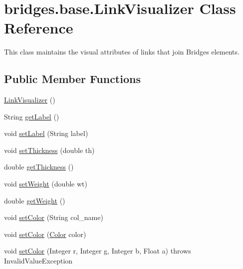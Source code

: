 \hypertarget{classbridges_1_1base_1_1_link_visualizer}{}\section{bridges.\+base.\+Link\+Visualizer Class Reference}
\label{classbridges_1_1base_1_1_link_visualizer}


This class maintains the visual attributes of links that join Bridges elements.  


\subsection*{Public Member Functions}
\begin{DoxyCompactItemize}
\item 
\mbox{\hyperlink{classbridges_1_1base_1_1_link_visualizer_a0b69f099fa264ae9097b0efe278c6a1b}{Link\+Visualizer}} ()
\item 
String \mbox{\hyperlink{classbridges_1_1base_1_1_link_visualizer_a9ed60a0f8a337cd2c98b2d6ab07b8601}{get\+Label}} ()
\item 
void \mbox{\hyperlink{classbridges_1_1base_1_1_link_visualizer_a073d84e04dd95c3848c9f4e0ad74eb77}{set\+Label}} (String label)
\item 
void \mbox{\hyperlink{classbridges_1_1base_1_1_link_visualizer_a702e9ca345d1a4a035baf2041f275849}{set\+Thickness}} (double th)
\item 
double \mbox{\hyperlink{classbridges_1_1base_1_1_link_visualizer_af1592d2a8664b00c1a51fdc0f8d1860a}{get\+Thickness}} ()
\item 
void \mbox{\hyperlink{classbridges_1_1base_1_1_link_visualizer_a21d5884d243cf5a08f9d544f5083a44c}{set\+Weight}} (double wt)
\item 
double \mbox{\hyperlink{classbridges_1_1base_1_1_link_visualizer_ac96d7fb118ae6c7e1bdd57c5e2c8639a}{get\+Weight}} ()
\item 
void \mbox{\hyperlink{classbridges_1_1base_1_1_link_visualizer_a92f306dbd73b961befa8ab4c0620a89e}{set\+Color}} (String col\+\_\+name)
\item 
void \mbox{\hyperlink{classbridges_1_1base_1_1_link_visualizer_ab05a7576f99818937276a4937eedeee1}{set\+Color}} (\mbox{\hyperlink{classbridges_1_1base_1_1_color}{Color}} color)
\item 
void \mbox{\hyperlink{classbridges_1_1base_1_1_link_visualizer_a003905cfe33e1704555b2b3a1cf99bad}{set\+Color}} (Integer r, Integer g, Integer b, Float a)  throws Invalid\+Value\+Exception 

\end{DoxyCompactItemize}
